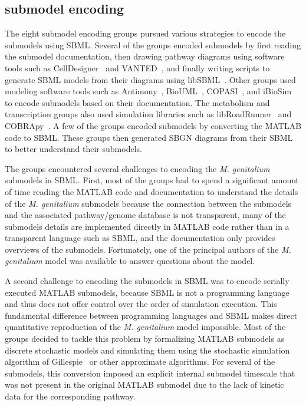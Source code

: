 \documentclass[journal,transmag]{IEEEtran}
\begin{document}
\subsection{submodel encoding}
The eight submodel encoding groups pursued various strategies to encode the submodels using SBML. Several of the groups encoded submodels by first reading the submodel documentation, then drawing pathway diagrams using software tools such as CellDesigner~\cite{funahashi2008celldesigner} and VANTED~\cite{Rohn2012}, and finally writing scripts to generate SBML models from their diagrams using libSBML~\cite{bornstein_2008}. Other groups used modeling software tools such as Antimony~\cite{Smith2009}, BioUML~\cite{Kolpakov2006}, COPASI~\cite{Mendes2009}, and iBioSim~\cite{Madsen2012} to encode submodels based on their documentation. The metabolism and transcription groups also used simulation libraries such as libRoadRunner~\cite{Somogyi17062015} and COBRApy~\cite{ebrahim2013cobrapy}. A few of the groups encoded submodels by converting the MATLAB code to SBML. These groups then generated SBGN diagrams from their SBML to better understand their submodels.

The groups encountered several challenges to encoding the \textit{M. genitalium} submodels in SBML. First, most of the groups had to spend a significant amount of time reading the MATLAB code and documentation to understand the details of the \textit{M. genitalium} submodels because the connection between the submodels and the associated pathway/genome database is not transparent, many of the submodels details are implemented directly in MATLAB code rather than in a transparent language such as SBML, and the documentation only provides overviews of the submodels. Fortunately, one of the principal authors of the \textit{M. genitalium} model was available to answer questions about the model.

A second challenge to encoding the submodels in SBML was to encode serially executed MATLAB submodels, because SBML is not a programming language and thus does not offer control over the order of simulation execution. This fundamental difference between programming languages and SBML makes direct quantitative reproduction of the \textit{M. genitalium} model impossible. Most of the groups decided to tackle this problem by formalizing MATLAB submodels as discrete stochastic models and simulating them using the stochastic simulation algorithm of Gillespie~\cite{gillespie1977} or other approximate algorithms. For several of the submodels, this conversion imposed an explicit internal submodel timescale that was not present in the original MATLAB submodel due to the lack of kinetic data for the corresponding pathway.
\end{document}
